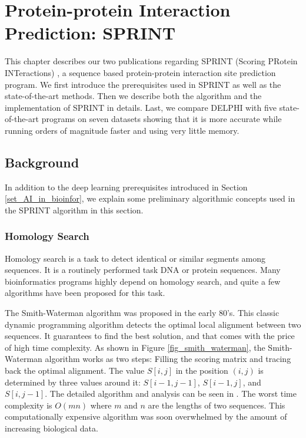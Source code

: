 \chapter{Protein-protein Interaction Prediction: SPRINT \label{chap_3}}
This chapter describes our two publications regarding SPRINT (Scoring PRotein INTeractions) \cite{li2017sprint, li2020predicting}, a sequence based protein-protein interaction site prediction program. We first introduce the prerequisites used in SPRINT as well as the state-of-the-art methods. Then we describe both the algorithm and the implementation of SPRINT in details.  Last, we compare DELPHI with five state-of-the-art programs on seven datasets showing that it is more accurate while running orders of magnitude faster and using very little memory.
\section{Background}
In addition to the deep learning prerequisites introduced in Section \ref{set_AI_in_bioinfor}, we explain some preliminary algorithmic concepts used in the SPRINT algorithm in this section.
\subsection{Homology Search}
Homology search is a task to detect identical or similar segments among sequences. It is a routinely performed task DNA or protein sequences. Many bioinformatics programs highly depend on homology search, and quite a few algorithms have been proposed for this task. 

The Smith-Waterman algorithm \cite{smith_waterman_1981} was proposed in the early 80's. This classic dynamic programming algorithm detects the optimal local alignment between two sequences. It guarantees to find the best solution, and that comes with the price of high time complexity. As shown in Figure \ref{fig_smith_waterman}, the Smith-Waterman algorithm works as two steps: Filling the scoring matrix and tracing back the optimal alignment. The value $S[i,j]$ in the position  $(i,j)$ is determined by three values around it: $S[i-1,j-1]$, $S[i-1,j]$, and $S[i,j-1]$. The detailed algorithm and analysis can be seen in \cite{smith_waterman_1981}. The worst time complexity is $O(mn)$ where $m$ and $n$ are the lengths of two sequences. This computationally expensive algorithm was soon overwhelmed by the amount of increasing biological data.

